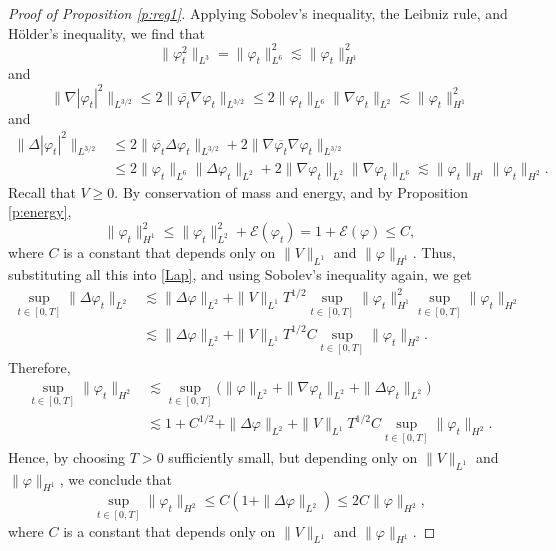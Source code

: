 \documentclass[11pt,a4paper]{scrartcl} %
\begin{document}
\begin{proof}[Proof of Proposition \ref{p:reg1}]
  
  Applying Sobolev's inequality, the Leibniz rule, and H\"older's inequality,
  we find that
  \begin{displaymath}
    \| \varphi_t^2 \|_{L^3} = \| \varphi_t \|_{L^6}^2 \apprle \| \varphi_t
    \|_{H^1}^2
  \end{displaymath}
  and
  \begin{displaymath}
    \| \nabla |\varphi_t|^2 \|_{L^{3/2}} \le 2 \| \overline{\varphi_t} \nabla
    \varphi_t \|_{L^{3/2}} \le 2 \| \varphi_t \|_{L^6} \| \nabla \varphi_t
    \|_{L^2} \apprle \| \varphi_t \|_{H^1}^2
  \end{displaymath}
  and
  \begin{align*}
    \| \Delta |\varphi_t|^2 \|_{L^{3/2}} & \le 2 \| \overline{\varphi_t}
    \Delta \varphi_t \|_{L^{3/2}} + 2 \| \nabla \overline{\varphi_t} \nabla
    \varphi_t \|_{L^{3/2}} \\
    & \le 2 \| \varphi_t \|_{L^6} \| \Delta \varphi_t \|_{L^2} + 2\| \nabla
    \varphi_t \|_{L^2} \| \nabla \varphi_t \|_{L^6} \apprle \| \varphi_t
    \|_{H^1} \| \varphi_t \|_{H^2}.
  \end{align*}
  Recall that $V \ge 0$. By conservation of mass and energy, and by
  Proposition \ref{p:energy},
  \begin{displaymath}
    \| \varphi_t \|_{H^1}^2 \le \| \varphi_t \|_{L^2}^2 +
    \mathcal{E}(\varphi_t) = 1 + \mathcal{E}(\varphi) \le C,
  \end{displaymath}
  where $C$ is a constant that depends only on $\| V \|_{L^1}$ and $\| \varphi
  \|_{H^1}$. Thus, substituting all this into \eqref{Lap}, and using Sobolev's
  inequality again, we get
  \begin{align*}
    \sup_{t \in [0,T]} \| \Delta \varphi_t \|_{L^2} & \apprle \| \Delta
    \varphi \|_{L^2} + \| V \|_{L^1} T^{1/2} \sup_{t \in [0,T]} \| \varphi_t
    \|_{H^1}^2 \sup_{t \in [0,T]} \| \varphi_t \|_{H^2} \\ & \apprle \|
    \Delta \varphi \|_{L^2} + \| V \|_{L^1} T^{1/2} C \sup_{t \in [0,T]} \|
    \varphi_t \|_{H^2}.
  \end{align*}
  Therefore,
  \begin{align*}
    \sup_{t \in [0,T]} \| \varphi_t \|_{H^2} & \apprle \sup_{t \in [0,T]}
    \big( \| \varphi \|_{L^2} + \| \nabla \varphi_t \|_{L^2} + \| \Delta
    \varphi_t \|_{L^2} \big) \\
    & \apprle 1 + C^{1/2} + \| \Delta \varphi \|_{L^2} + \| V \|_{L^1} T^{1/2}
    C \sup_{t \in [0,T]} \| \varphi_t \|_{H^2}.
  \end{align*}
  Hence, by choosing $T > 0$ sufficiently small, but depending only on $\| V
  \|_{L^1}$ and $\| \varphi \|_{H^1}$, we conclude that
  \begin{displaymath}
    \sup_{t \in [0,T]} \| \varphi_t \|_{H^2} \le C (1 + \| \Delta \varphi
    \|_{L^2}) \le 2C \| \varphi \|_{H^2},
  \end{displaymath}
  where $C$ is a constant that depends only on $\| V \|_{L^1}$ and $\| \varphi
  \|_{H^1}$.
\end{proof}
\end{document}
